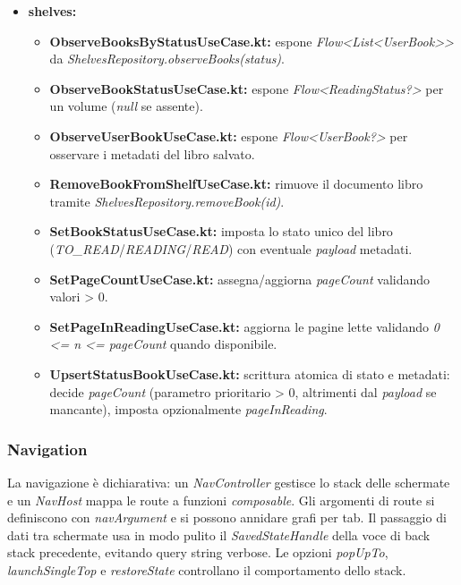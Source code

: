 \documentclass{article}
\begin{document}
\begin{itemize}
  \item \textbf{shelves:}
  \begin{itemize}
    \item \textbf{ObserveBooksByStatusUseCase.kt:} espone \textit{Flow\textless{}List\textless{}UserBook\textgreater{}\textgreater{}} da \textit{ShelvesRepository.observeBooks(status)}.
    \item \textbf{ObserveBookStatusUseCase.kt:} espone \textit{Flow\textless{}ReadingStatus?\textgreater{}} per un volume (\textit{null} se assente).
    \item \textbf{ObserveUserBookUseCase.kt:} espone \textit{Flow\textless{}UserBook?\textgreater{}} per osservare i metadati del libro salvato.
    \item \textbf{RemoveBookFromShelfUseCase.kt:} rimuove il documento libro tramite \textit{ShelvesRepository.removeBook(id)}.
    \item \textbf{SetBookStatusUseCase.kt:} imposta lo stato unico del libro (\textit{TO\_READ}/\textit{READING}/\textit{READ}) con eventuale \textit{payload} metadati.
    \item \textbf{SetPageCountUseCase.kt:} assegna/aggiorna \textit{pageCount} validando valori \textgreater{} 0.
    \item \textbf{SetPageInReadingUseCase.kt:} aggiorna le pagine lette validando \textit{0 \textless{}= n \textless{}= pageCount} quando disponibile.
    \item \textbf{UpsertStatusBookUseCase.kt:} scrittura atomica di stato e metadati: decide \textit{pageCount} (parametro prioritario \textgreater{} 0, altrimenti dal \textit{payload} se mancante), imposta opzionalmente \textit{pageInReading}.
  \end{itemize}
\end{itemize}

\subsubsection{Navigation}
La navigazione è dichiarativa: un \textit{NavController} gestisce lo stack delle schermate e un \textit{NavHost} mappa le route a funzioni \textit{composable}. Gli argomenti di route si definiscono con \textit{navArgument} e si possono annidare grafi per tab. Il passaggio di dati tra schermate usa in modo pulito il \textit{SavedStateHandle} della voce di back stack precedente, evitando query string verbose. Le opzioni \textit{popUpTo}, \textit{launchSingleTop} e \textit{restoreState} controllano il comportamento dello stack.
\end{document}
